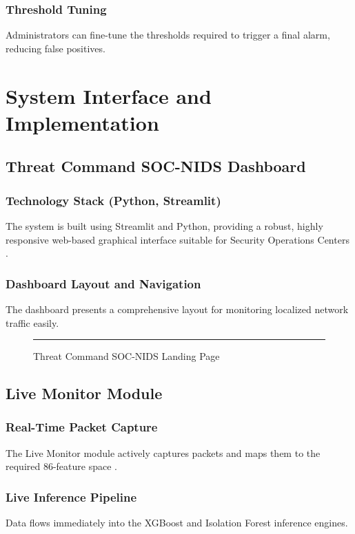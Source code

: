 \documentclass[12pt, a4paper]{report}
\begin{document}
\subsection{Threshold Tuning}
Administrators can fine-tune the thresholds required to trigger a final alarm, reducing false positives.

\chapter{System Interface and Implementation}
\section{Threat Command SOC-NIDS Dashboard}
\subsection{Technology Stack (Python, Streamlit)}
The system is built using Streamlit and Python, providing a robust, highly responsive web-based graphical interface suitable for Security Operations Centers \cite{ref7}.
\subsection{Dashboard Layout and Navigation}
The dashboard presents a comprehensive layout for monitoring localized network traffic easily.

\begin{figure}[htbp]
    \centering
    \rule{\textwidth}{6cm}
    \caption{Threat Command SOC-NIDS Landing Page}
    \label{fig:landing_page}
\end{figure}

\section{Live Monitor Module}
\subsection{Real-Time Packet Capture}
The Live Monitor module actively captures packets and maps them to the required 86-feature space \cite{ref8}.
\subsection{Live Inference Pipeline}
Data flows immediately into the XGBoost and Isolation Forest inference engines.
\end{document}
